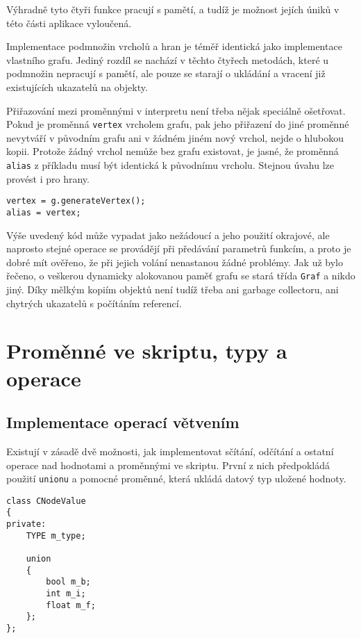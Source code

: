 \documentclass[11pt,twoside,a4paper]{book}
\begin{document}
Výhradně tyto čtyři funkce pracují s pamětí, a tudíž je možnost jejích úniků v této části aplikace vyloučená.

Implementace podmnožin vrcholů a hran je téměř identická jako implementace vlastního grafu. Jediný rozdíl se nachází v těchto čtyřech metodách, které u podmnožin nepracují s pamětí, ale pouze se starají o ukládání a vracení již existujících ukazatelů na objekty.

Přiřazování mezi proměnnými v interpretu není třeba nějak speciálně ošetřovat. Pokud je proměnná \texttt{vertex} vrcholem grafu, pak jeho přiřazení do jiné proměnné nevytváří v původním grafu ani v žádném jiném nový vrchol, nejde o hlubokou kopii. Protože žádný vrchol nemůže bez grafu existovat, je jasné, že proměnná \texttt{alias} z příkladu musí být identická k původnímu vrcholu. Stejnou úvahu lze provést i pro hrany.

\begin{verbatim}
vertex = g.generateVertex();
alias = vertex;
\end{verbatim}

Výše uvedený kód může vypadat jako nežádoucí a jeho použití okrajové, ale naprosto stejné operace se provádějí při předávání parametrů funkcím, a proto je dobré mít ověřeno, že při jejich volání nenastanou žádné problémy. Jak už bylo řečeno, o veškerou dynamicky alokovanou paměť grafu se stará třída \texttt{Graf} a nikdo jiný. Díky mělkým kopiím objektů není tudíž třeba ani garbage collectoru, ani chytrých ukazatelů s počítáním referencí.


\section{Proměnné ve skriptu, typy a operace}

\subsection{Implementace operací větvením}

Existují v zásadě dvě možnosti, jak implementovat sčítání, odčítání a ostatní operace nad hodnotami a proměnnými ve skriptu. První z nich předpokládá použití \texttt{unionu} a pomocné proměnné, která ukládá datový typ uložené hodnoty.

\begin{verbatim}
class CNodeValue
{
private:
    TYPE m_type;

    union
    {
    	bool m_b;
        int m_i;
        float m_f;
    };
};
\end{verbatim}
\end{document}
